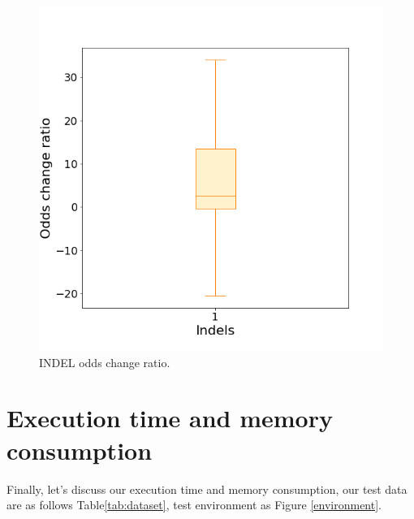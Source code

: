 \begin{figure}[H]
    \centering
    \includegraphics[width=0.6\columnwidth]{body/image/indel_odds_change.png}
    \captionsetup{labelfont=bf}
    \renewcommand{\baselinestretch}{1.0}
    \caption[INDEL odds change ratio]{INDEL odds change ratio.}
    \label{indel_odds_change}
\end{figure}

\section{Execution time and memory consumption}

Finally, let’s discuss our execution time and memory consumption, our test data are as follows Table\ref{tab:dataset}, test environment as Figure \ref{environment}.

\vspace{1cm}


